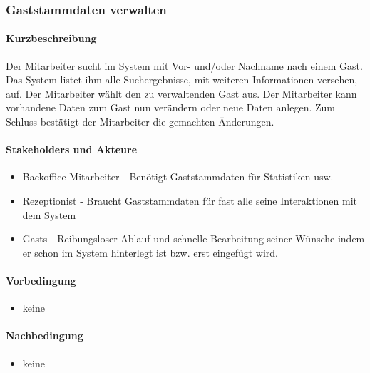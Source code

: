 \subsubsection{Gaststammdaten verwalten}

\paragraph{Kurzbeschreibung}
Der \Gls{Mitarbeiter} sucht im System mit Vor- und/oder Nachname nach einem \Gls{Gast}. Das System listet ihm alle Suchergebnisse, mit weiteren Informationen versehen, auf. Der \Gls{Mitarbeiter} wählt den zu verwaltenden \Gls{Gast} aus. Der \Gls{Mitarbeiter} kann vorhandene Daten zum \Gls{Gast} nun verändern oder neue Daten anlegen. Zum Schluss bestätigt der \Gls{Mitarbeiter} die gemachten Änderungen.

\paragraph{Stakeholders und Akteure}
\begin{itemize}
	\item \Gls{Backoffice}-\Gls{Mitarbeiter} - Benötigt Gaststammdaten für Statistiken usw.
	\item \Gls{Rezeptionist} - Braucht Gaststammdaten für fast alle seine Interaktionen mit dem System
	\item \Glspl{Gast} - Reibungsloser Ablauf und schnelle Bearbeitung seiner Wünsche indem er schon im System hinterlegt ist bzw. erst eingefügt wird.
\end{itemize}

\paragraph{Vorbedingung}
\begin{itemize}
	\item keine
\end{itemize}

\paragraph{Nachbedingung}
\begin{itemize}
	\item keine
\end{itemize}

